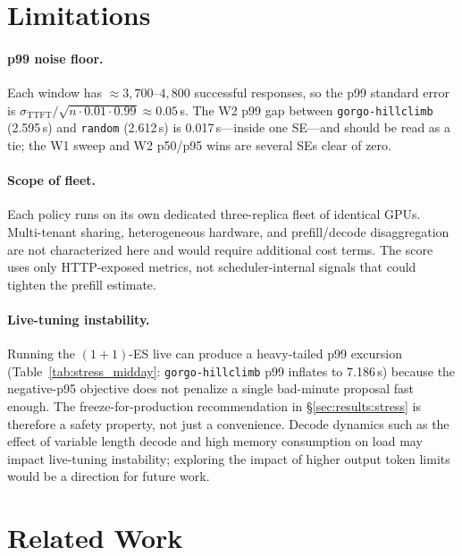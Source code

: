 \documentclass{article}
\begin{document}
\section{Limitations}
\label{sec:limitations}

\paragraph{p99 noise floor.}
Each window has $\approx\!3{,}700$--$4{,}800$ successful responses, so the p99
standard error is $\sigma_{\mathrm{TTFT}}/\sqrt{n\cdot 0.01\cdot 0.99}\approx
0.05$\,s. The W2 p99 gap between \texttt{gorgo-hillclimb} (2.595\,s) and
\texttt{random} (2.612\,s) is 0.017\,s---inside one SE---and should be read as
a tie; the W1 sweep and W2 p50/p95 wins are several SEs clear of zero.

\paragraph{Scope of fleet.}
Each policy runs on its own dedicated three-replica fleet of identical GPUs. Multi-tenant sharing, heterogeneous hardware, and prefill/decode disaggregation \citep{distserve2024,splitwise2024} are not characterized here and would require additional cost terms. The score uses only HTTP-exposed metrics, not scheduler-internal signals \citep{kvflow2025,lpc2025} that could tighten the prefill estimate.

\paragraph{Live-tuning instability.}
Running the $(1{+}1)$-ES live can produce a heavy-tailed p99 excursion
(Table~\ref{tab:stress_midday}: \texttt{gorgo-hillclimb} p99 inflates to
7.186\,s) because the negative-p95 objective does not penalize a single
bad-minute proposal fast enough. The freeze-for-production recommendation in
\S\ref{sec:results:stress} is therefore a safety property, not just a
convenience. Decode dynamics such as the effect of variable length decode and high memory consumption on load may impact live-tuning instability; exploring the impact of higher output token limits would be a direction for future work.

\section{Related Work}
\label{sec:related}
\end{document}
